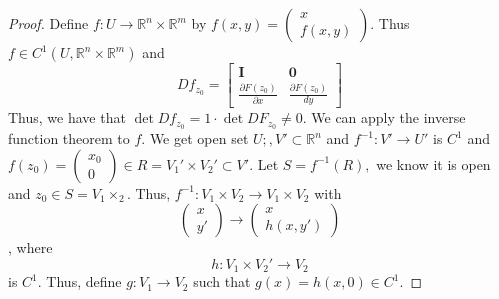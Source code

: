 \documentclass[10pt, oneside]{article}
\newcommand{\bbR}{\mathbb{R}}
\theoremstyle{definition}
\begin{document}
\begin{proof}
    Define $f: U \to \bbR^n \times \bbR^m$ by $f(x,y) = \begin{pmatrix}
        x\\ f(x,y)
    \end{pmatrix}.$ Thus $f\in C^1(U, \bbR^n \times \bbR^m)$ and 
    \[Df_{z_0} = \begin{bmatrix}
        \textbf{I} & \textbf{0}\\
        \frac{\partial F(z_0)}{\partial x} & \frac{\partial F(z_0)}{dy}
    \end{bmatrix}\]
    Thus, we have that $\det Df_{z_0} = 1 \cdot \det DF_{z_0}\neq 0.$ We can apply the inverse function theorem to $f.$ We get open set $U;, V' \subset \bbR^n$ and $f^{-1}: V' \to U'$ is $C^1$ and $f(z_0) = \begin{pmatrix}
        x_0 \\ 0
    \end{pmatrix}  \in R = V_1' \times V_2' \subset V'.$  Let $S = f^{-1}(R),$ we know it is open and $z_0 \in S = V_1 \times _2.$ Thus, $f^{-1}: V_1 \times V_2 \to V_1 \times V_2$ with
    \[\begin{pmatrix}
        x\\y'
    \end{pmatrix} \to \begin{pmatrix}
        x\\ h(x,y')
    \end{pmatrix}\], where \[h: V_1 \times V_2' \to V_2\] is $C^1.$ Thus, define $g: V_1 \to V_2$ such that $g(x) = h(x,0) \in C^1.$ 
\end{proof}


\newpage
\end{document}
